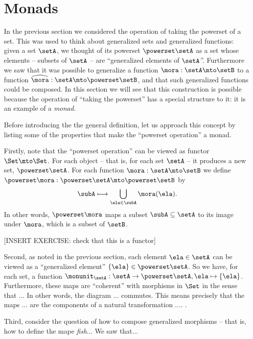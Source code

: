 

\section{Monads}
\label{sec:monads}

In the previous section we considered the operation of taking the powerset of a set. This was used to think about generalized sets and generalized functions: given a set $\setA$, we thought of its powerset $\powerset \setA$ as a set whose elements -- subsets of $\setA$ -- are ``generalized elements of $\setA$''. Furthermore we saw that it was possible to generalize a function $\mora : \setA \mto \setB$ to a function $\widehat \mora:  \setA \mto \powerset \setB$, and that such generalized functions could be composed. In this section we will see that this construction is possible because the operation of ``taking the powerset'' has a special structure to it: it is an example of a \emph{monad}. 

Before introducing the the general definition, let us approach this concept by listing some of the properties that make the ``powerset operation''  a monad. 

Firstly, note that the ``powerset operation'' can be viewed as functor $\Set \mto \Set$. For each object -- that is, for each set $\setA$ -- it produces a new set, $\powerset \setA$. For each function $\mora: \setA \mto \setB$ we define $\powerset \mora : \powerset \setA \mto \powerset \setB$ by
\begin{equation}\label{eq:powerset-functor}
 \subA \longmapsto \bigcup_{\ela \in \subA} \mora(\ela).
\end{equation}
In other words, $\powerset \mora$ maps a subset $\subA \subseteq \setA$ to its image under $\mora$, which is a subset of $\setB$. 


[INSERT EXERCISE: check that this is a functor]


Second, as noted in the previous section, each element $\ela \in \setA$ can be viewed as a ``generalized element'' $\{ \ela \} \in \powerset \setA$. So we have, for each set, a function $\monunit_\setA : \setA \to \powerset \setA, \ela \mapsto \{ \ela \}$. 
Furthermore, these maps are ``coherent'' with morphisms in $\Set$ in the sense that ...  In other words, the diagram ... commutes. This means precisely that the maps ... are the components of a natural transformation .... . 

Third, consider the question of how to compose generalized morphisms -- that is, how to define the mape \emph{fish}... We saw that... 

